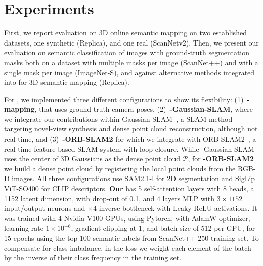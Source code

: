 \section{Experiments}
\label{sec:experiments}
{First, we report \ours evaluation} on 3D online semantic mapping on two established datasets, one synthetic (Replica), and one real (ScanNetv2).
{Then, we present our \clipours evaluation} on semantic classification of images with ground-truth segmentation masks both on a dataset with multiple masks per image (ScanNet++) and with a single mask per image (ImageNet-S){, and against alternative methods integrated into \ours for 3D semantic mapping (Replica).}

{ For \ours,} we implemented three different configurations {to show its flexibility}: (1)~\textbf{\ours-mapping}, that uses ground-truth camera poses, (2)~\textbf{\ours-Gaussian-SLAM}, {where we} integrate our contributions within Gaussian-SLAM~\cite{yugay2023gaussian}{, a SLAM method targeting novel-view synthesis and dense point cloud reconstruction, although not real-time}, and (3)~\textbf{\ours-ORB-SLAM2} for which we {integrate} {with ORB-SLAM2~\cite{mur2017orb}, a real-time feature-based SLAM system with loop-closure. While \ours-Gaussian-SLAM uses the center of 3D Gaussians as the dense point cloud \(\mathcal{P}\), for \textbf{\ours-ORB-SLAM2} we build a dense point cloud by registering the local point clouds from the RGB-D images}.
All three configurations use SAM2.1-l for 2D segmentation and SigLip ViT-SO400 for CLIP descriptors. %
%
{\textbf{Our \clipours}} has 5 self-attention layers with 8 heads, {a 1152 latent dimension, with drop-out of 0.1, }and 4 layers MLP {with \(3\times 1152\) input/output neurons and \(\times4\) inverse bottleneck with Leaky ReLU activations.} {It was trained with 4 Nvidia V100 GPUs, using Pytorch, with AdamW optimizer, learning rate \(1\times10^{-6}\), gradient clipping at 1, and batch size of 512 per GPU,} for 15 epochs using the top 100 semantic labels from ScanNet++ 250 training set. {To compensate for class imbalance, in the loss we weight each element of the batch by the inverse of their class frequency in the training set.}

